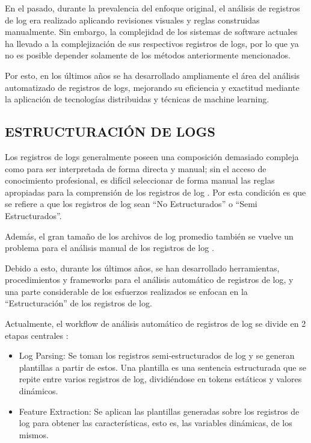 En el pasado, durante la prevalencia del enfoque original, el análisis de registros de log era realizado aplicando revisiones visuales y reglas construidas manualmente. Sin embargo, la complejidad de los sistemas de software actuales ha llevado a la complejización de sus respectivos registros de logs, por lo que ya no es posible depender solamente de los métodos anteriormente mencionados. \cite{ma2023automatic}

Por esto, en los últimos años se ha desarrollado ampliamente el área del análisis automatizado de registros de logs, mejorando su eficiencia y exactitud mediante la aplicación de tecnologías distribuidas y técnicas de machine learning. \cite{ma2023automatic}

\subsection{ESTRUCTURACIÓN DE LOGS}
Los registros de logs generalmente poseen una composición demasiado compleja como para ser interpretada de forma directa y manual; sin el acceso de conocimiento profesional, es difícil seleccionar de forma manual las reglas apropiadas para la comprensión de los registros de log \cite{ma2023automatic}. Por esta condición es que se refiere a que los registros de log sean “No Estructurados” o “Semi Estructurados”. 

Además, el gran tamaño de los archivos de log promedio también se vuelve un problema para el análisis manual de los registros de log \cite{ma2023automatic}.

Debido a esto, durante los últimos años, se han desarrollado herramientas, procedimientos y frameworks para el análisis automático de registros de log, y una parte considerable de los esfuerzos realizados se enfocan en la “Estructuración” de los registros de log.

Actualmente, el workflow de análisis automático de registros de log se divide en 2 etapas centrales \cite{ma2023automatic}:

\begin{itemize}
    \item Log Parsing: Se toman los registros semi-estructurados de log y se generan plantillas a partir de estos. Una plantilla es una sentencia estructurada que se repite entre varios registros de log, dividiéndose en tokens estáticos y valores dinámicos. \cite{ma2023automatic}

    \item Feature Extraction: Se aplican las plantillas generadas sobre los registros de log para obtener las características, esto es, las variables dinámicas, de los mismos. \cite{ma2023automatic}

\end{itemize}
